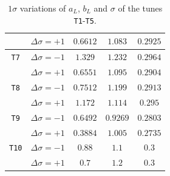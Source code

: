 \documentclass[aps,preprint,floatfix,nofootinbib,showpacs]{revtex4-1}
\begin{document}
\begin{table}[!h]
\begin{center}
\begin{tabular}{ c | c | c | c | c  }
              & $\Delta\sigma=+1$ \hspace{0.5cm}  & $0.6612$  & $1.083$  & $0.2925$ \\ \hline \hline
  \texttt{T7} & $\Delta\sigma=-1$ \hspace{0.5cm}  & $1.329$   & $1.232$  & $0.2964$ \\ 
              & $\Delta\sigma=+1$ \hspace{0.5cm}  & $0.6551$  & $1.095$  & $0.2904$ \\ \hline \hline
  \texttt{T8} & $\Delta\sigma=-1$ \hspace{0.5cm}  & $0.7512$  & $1.199$  & $0.2913$   \\ 
              & $\Delta\sigma=+1$ \hspace{0.5cm}  & $1.172$   & $1.114$  & $0.295$    \\ \hline \hline
  \texttt{T9} & $\Delta\sigma=-1$ \hspace{0.5cm}  & $0.6492$  & $0.9269$ & $0.2803$   \\
              & $\Delta\sigma=+1$ \hspace{0.5cm}  & $0.3884$  & $1.005$  & $0.2735$  \\ \hline \hline
 \texttt{T10} & $\Delta\sigma=-1$ \hspace{0.5cm}  &  $0.88$   &  $1.1$   &  $0.3$  \\
              & $\Delta\sigma=+1$ \hspace{0.5cm}  &  $0.7$    &  $1.2$   &   $0.3$  \\ \hline \hline
 \end{tabular}
 \end{center}
 \caption{$1\sigma$ variations of $a_L$, $b_L$ and $\sigma$ of the tunes \texttt{T1}-\texttt{T5}.}
 \label{Table.variations1}
\end{table}
\clearpage
\end{document}

